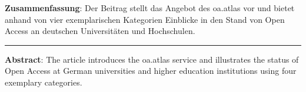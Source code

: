 \textbf{Zusammenfassung}: Der Beitrag stellt das Angebot des oa.atlas
vor und bietet anhand von vier exemplarischen Kategorien Einblicke in
den Stand von Open Access an deutschen Universitäten und Hochschulen.

\begin{center}\rule{0.5\linewidth}{0.5pt}\end{center}

\textbf{Abstract}: The article introduces the oa.atlas service and
illustrates the status of Open Access at German universities and higher
education institutions using four exemplary categories.
